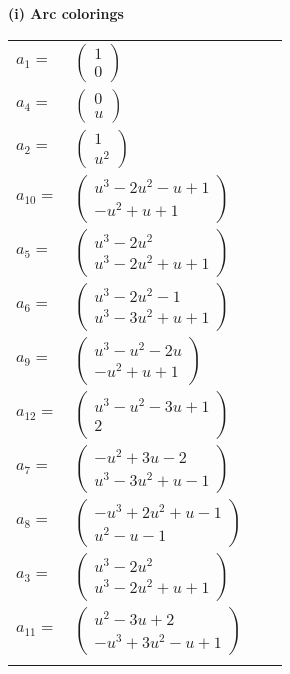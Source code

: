\documentclass[1p]{elsarticle_modified}
\theoremstyle{definition}
\begin{document}
\flushleft \textbf{(i) Arc colorings}\\
\begin{tabular}{m{7pt} m{180pt} m{7pt} m{180pt} }
\flushright $a_{1}=$&$\begin{pmatrix}1\\0\end{pmatrix}$ \\
\flushright $a_{4}=$&$\begin{pmatrix}0\\u\end{pmatrix}$ \\
\flushright $a_{2}=$&$\begin{pmatrix}1\\u^2\end{pmatrix}$ \\
\flushright $a_{10}=$&$\begin{pmatrix}u^3-2 u^2- u+1\\- u^2+u+1\end{pmatrix}$ \\
\flushright $a_{5}=$&$\begin{pmatrix}u^3-2 u^2\\u^3-2 u^2+u+1\end{pmatrix}$ \\
\flushright $a_{6}=$&$\begin{pmatrix}u^3-2 u^2-1\\u^3-3 u^2+u+1\end{pmatrix}$ \\
\flushright $a_{9}=$&$\begin{pmatrix}u^3- u^2-2 u\\- u^2+u+1\end{pmatrix}$ \\
\flushright $a_{12}=$&$\begin{pmatrix}u^3- u^2-3 u+1\\2\end{pmatrix}$ \\
\flushright $a_{7}=$&$\begin{pmatrix}- u^2+3 u-2\\u^3-3 u^2+u-1\end{pmatrix}$ \\
\flushright $a_{8}=$&$\begin{pmatrix}- u^3+2 u^2+u-1\\u^2- u-1\end{pmatrix}$ \\
\flushright $a_{3}=$&$\begin{pmatrix}u^3-2 u^2\\u^3-2 u^2+u+1\end{pmatrix}$ \\
\flushright $a_{11}=$&$\begin{pmatrix}u^2-3 u+2\\- u^3+3 u^2- u+1\end{pmatrix}$\\&\end{tabular}
\end{document}
